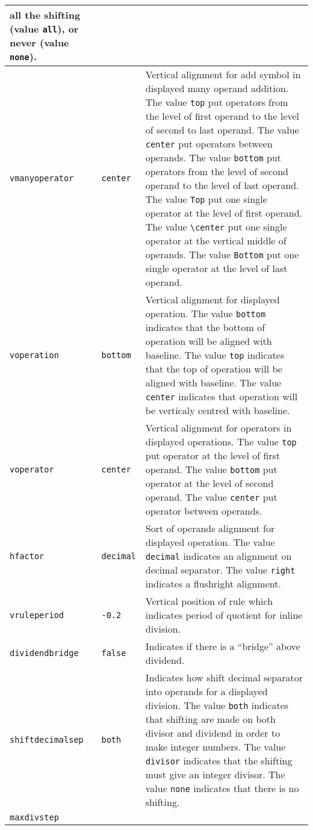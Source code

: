 \documentclass[12pt]{report}
\begin{document}
\begin{longtable}{|l|l|p{7cm}|}
  all the shifting (value \verb+all+), or never (value
  \verb+none+). \\\hline
  \verb+vmanyoperator+ &
  \verb+center+ &
  Vertical alignment for add symbol in displayed many operand
  addition. The value \verb+top+ put operators from the level of first
  operand to the level of second to last operand. The value
  \verb+center+ put operators between operands. The value
  \verb+bottom+ put operators from the level of second operand to the
  level of last operand. The value \verb+Top+ put one single operator
  at the level of first operand. The value \verb+\center+ put one
  single operator at the vertical middle of operands. The value
  \verb+Bottom+ put one single operator at the level of last
  operand. \\\hline
  \verb+voperation+ &
  \verb+bottom+ &
  Vertical alignment for displayed operation. The value \verb+bottom+
  indicates that the bottom of operation will be aligned with
  baseline. The value \verb+top+ indicates that the top of operation
  will be aligned with baseline. The value \verb+center+ indicates
  that operation will be verticaly centred with baseline. \\\hline
  \verb+voperator+ &
  \verb+center+ &
  Vertical alignment for operators in displayed operations. The value
  \verb+top+ put operator at the level of first operand. The value
  \verb+bottom+ put operator at the level of second operand. The value
  \verb+center+ put operator between operands. \\\hline
  \verb+hfactor+ &
  \verb+decimal+ &
  Sort of operands alignment for displayed operation. The value
  \verb+decimal+ indicates an alignment on decimal separator. The
  value \verb+right+ indicates a flushright alignment. \\\hline
  \verb+vruleperiod+ &
  \verb+-0.2+ &
  Vertical position of rule which indicates period of quotient for
  inline division. \\\hline
  \verb+dividendbridge+ &
  \verb+false+ &
  Indicates if there is a ``bridge'' above dividend. \\\hline
  \verb+shiftdecimalsep+ &
  \verb+both+ &
  Indicates how shift decimal separator into operands for a displayed
  division. The value \verb+both+ indicates that shifting are made on
  both divisor and dividend in order to make integer numbers. The
  value \verb+divisor+ indicates that the shifting must give an
  integer divisor. The value \verb+none+ indicates that there is no
  shifting. \\\hline
  \verb+maxdivstep+ &

\end{longtable}
\end{document}

